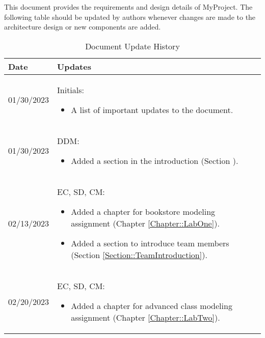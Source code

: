 This document provides the requirements and design details of MyProject.
The following table should be
updated by authors whenever changes are made to the architecture
design or new components are added.

\begin{longtable}{|l||p{13.5cm}|}
	\caption{Document Update History \label{Table::UpdateHistory}} \\
	\hline
	\textbf{Date} & \textbf{Updates}                               \\
	\hline
	\endhead

	01/30/2023    & Initials:
	\begin{itemize}[topsep=0pt,itemsep=0pt,parsep=0pt,partopsep=0pt,leftmargin=12pt]
		\item A list of important updates to the document.
	\end{itemize}
	\\ \hline

	01/30/2023    & DDM:
	\begin{itemize}[topsep=0pt,itemsep=0pt,parsep=0pt,partopsep=0pt,leftmargin=12pt]
		\item Added a section in the introduction (Section ). %
	\end{itemize}
	\\ \hline

	02/13/2023    & EC, SD, CM:
	\begin{itemize}[topsep=0pt,itemsep=0pt,parsep=0pt,partopsep=0pt,leftmargin=12pt]
		\item Added a chapter for bookstore modeling assignment (Chapter \ref{Chapter::LabOne}).
		\item Added a section to introduce team members (Section \ref{Section::TeamIntroduction}).
	\end{itemize}
	\\ \hline

	02/20/2023    & EC, SD, CM:
	\begin{itemize}[topsep=0pt,itemsep=0pt,parsep=0pt,partopsep=0pt,leftmargin=12pt]
		\item Added a chapter for advanced class modeling assignment (Chapter \ref{Chapter::LabTwo}).
	\end{itemize}
	\\ \hline


\end{longtable}

